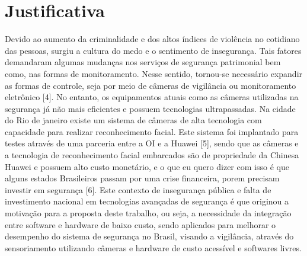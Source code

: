 
\section{Justificativa} 
Devido ao aumento da criminalidade e dos altos índices de violência no cotidiano das pessoas, surgiu a cultura do medo e o sentimento de insegurança. Tais fatores demandaram algumas mudanças nos serviços de segurança patrimonial bem como, nas formas de monitoramento. Nesse sentido, tornou-se necessário expandir as formas de controle, seja por meio de câmeras de vigilância ou monitoramento eletrônico [4]. No entanto, os equipamentos atuais como as câmeras utilizadas na segurança já não mais eficientes e possuem tecnologias ultrapassadas. 
Na cidade do Rio de janeiro existe um sistema de câmeras de alta tecnologia com capacidade para realizar reconhecimento facial. Este sistema foi implantado para testes através de uma parceria entre a OI e a Huawei [5], sendo que as câmeras e a tecnologia de reconhecimento facial embarcados são de propriedade da Chinesa Huawei e possuem alto custo monetário, e o que eu quero dizer com isso é que alguns estados Brasileiros passam por uma crise financeira, porem precisam investir em segurança [6].
Este contexto de insegurança pública e falta de investimento nacional em tecnologias avançadas de segurança é que originou a motivação para a proposta deste trabalho, ou seja, a necessidade da integração entre software e hardware de baixo custo, sendo aplicados para melhorar o desempenho do sistema de segurança no Brasil, visando a vigilância, através do sensoriamento utilizando câmeras e hardware de custo acessível e softwares livres.



